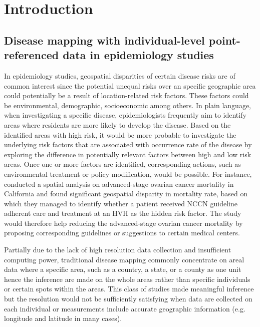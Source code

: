 \chapter{Introduction}

\section{Disease mapping with individual-level point-referenced data in epidemiology studies }


In epidemiology studies, geospatial disparities of certain disease risks are of common interest since the potential unequal risks over an specific geographic area could potentially be a result of location-related risk factors. These factors could be environmental, demographic, socioeconomic among others. In plain language, when investigating a specific disease, epidemiologists frequently aim to identify areas where residents are more likely to develop the disease. Based on the identified areas with high risk, it would be more probable to investigate the underlying risk factors that are associated with occurrence rate of the disease by exploring the difference in potentially relevant factors between high and low risk areas. Once one or more factors are identified, corresponding actions, such as environmental treatment or policy modification, would be possible. For instance, \cite{bristow2015spatial} conducted a spatial analysis on advanced-stage ovarian cancer mortality in California and found significant geospatial disparity in mortality rate, based on which they managed to identify whether a patient received NCCN guideline adherent care and treatment at an HVH as the hidden risk factor. The study would therefore help reducing the advanced-stage ovarian cancer mortality by proposing corresponding guidelines or suggestions to certain medical centers. 


Partially due to the lack of high resolution data collection and insufficient computing power, traditional disease mapping commonly concentrate on areal data where a specific area, such as a country, a state, or a county as one unit hence the inference are made on the whole areas rather than specific individuals or certain spots within the areas. This class of studies made meaningful inference but the resolution would not be sufficiently satisfying when data are collected on each individual or measurements include accurate geographic information (e.g. longitude and latitude in many cases). 

